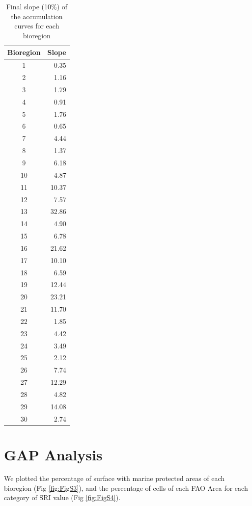 \documentclass[12pt,authoryear]{elsarticle}
\begin{document}
\begin{table}[h]
\centering
\begin{tabular}{| c | r |}
  \hline
\textbf{Bioregion} & \textbf{Slope} \\ 
  \hline
  \hline
1 & 0.35 \\ 
2 & 1.16 \\ 
3 & 1.79 \\ 
4 & 0.91 \\ 
5 & 1.76 \\ 
6 & 0.65 \\ 
7 & 4.44 \\ 
8 & 1.37 \\ 
9 & 6.18 \\ 
10 & 4.87 \\ 
11 & 10.37 \\ 
12 & 7.57 \\ 
13 & 32.86 \\ 
14 & 4.90 \\ 
15 & 6.78 \\ 
16 & 21.62 \\ 
17 & 10.10 \\ 
18 & 6.59 \\ 
19 & 12.44 \\ 
20 & 23.21 \\ 
21 & 11.70 \\ 
22 & 1.85 \\ 
23 & 4.42 \\ 
24 & 3.49 \\ 
25 & 2.12 \\ 
26 & 7.74 \\ 
27 & 12.29 \\ 
28 & 4.82 \\ 
29 & 14.08 \\ 
30 & 2.74 \\ 
  \hline
   \hline
\end{tabular}
\caption{Final slope (10$\%$) of the accumulation curves for each bioregion}
\label{tab:slope}
\end{table}

\section{GAP Analysis}
\label{sec:gap-analysis-1}
We plotted the percentage of surface with marine protected areas of each bioregion (Fig \ref{fig:FigS3}), and the percentage of cells of each FAO Area for each category of SRI value (Fig \ref{fig:FigS4}).
\end{document}
